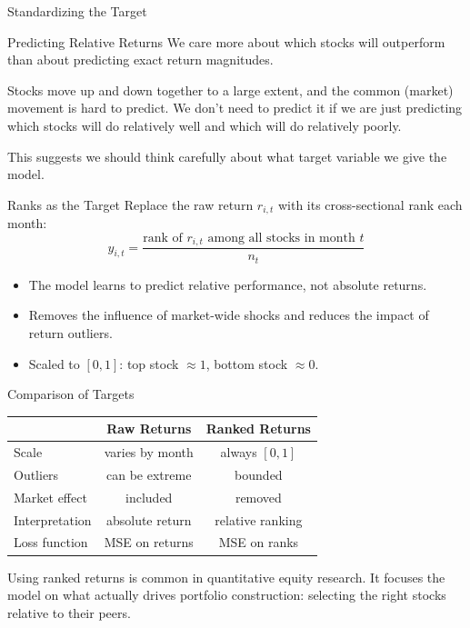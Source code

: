 \documentclass[aspectratio=169,t]{beamer}
\begin{document}

\begin{frame}[c]
\centering
\Huge Standardizing the Target
\end{frame}

\begin{frame}{Predicting Relative Returns}
We care more about \alert{which stocks will outperform} than about predicting exact return magnitudes.
\vspace{0.15cm}

\alert{Stocks move up and down together to a large extent, and the common (market) movement is hard to predict.  We don't need to predict it if we are just predicting which stocks will do relatively well and which will do relatively poorly.}

\vspace{0.15cm}
This suggests we should think carefully about what target variable we give the model.
\end{frame}

\begin{frame}{Ranks as the Target}
Replace the raw return $r_{i,t}$ with its \alert{cross-sectional rank} each month:
\[
y_{i,t} = \frac{\text{rank of } r_{i,t} \text{ among all stocks in month } t}{n_t}
\]

\begin{itemize}
\item The model learns to predict \alert{relative performance}, not absolute returns.
\item Removes the influence of market-wide shocks and reduces the impact of return outliers.
\item Scaled to $[0,1]$: top stock $\approx 1$, bottom stock $\approx 0$.
\end{itemize}
\end{frame}

\begin{frame}{Comparison of Targets}
\begin{center}
\begin{tabular}{lcc}
\toprule
& \textbf{Raw Returns} & \textbf{Ranked Returns} \\
\midrule
Scale & varies by month & always $[0,1]$ \\
Outliers & can be extreme & bounded \\
Market effect & included & removed \\
Interpretation & absolute return & relative ranking \\
Loss function & MSE on returns & MSE on ranks \\
\bottomrule
\end{tabular}
\end{center}

\vspace{0.3cm}
Using ranked returns is common in quantitative equity research.  It focuses the model on what actually drives portfolio construction: \alert{selecting the right stocks relative to their peers}.
\end{frame}
\end{document}
